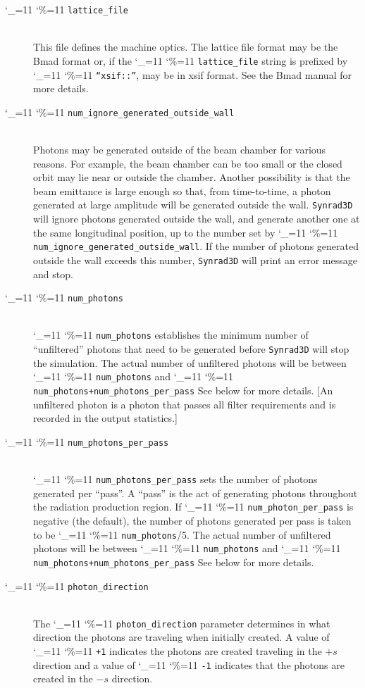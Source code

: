 \documentclass[11pt,openany]{report}
\newcommand{\srthree}{\texttt{Synrad3D}\xspace}
\newcommand\ttcmd{\begingroup\catcode`\_=11 \catcode`\%=11 \dottcmd}
\newcommand\dottcmd[1]{\texttt{#1}\endgroup}
\newcommand{\vn}{\ttcmd}
\newcommand{\Newline}{\hfil \\}
\begin{document}
\begin{description}
  \item[\vn{lattice_file}] \Newline
This file defines the machine optics. The lattice file format may be
the Bmad format or, if the \vn{lattice_file} string is prefixed by
\vn{``xsif::''}, may be in xsif format. See the Bmad manual for more details.

  \item[\vn{num_ignore_generated_outside_wall}] \Newline
Photons may be generated outside of the beam chamber for various
reasons. For example, the beam chamber can be too small or the closed
orbit may lie near or outside the chamber. Another possibility is that
the beam emittance is large enough so that, from time-to-time, a
photon generated at large amplitude will be generated outside the
wall. \srthree will ignore photons generated outside the wall, and
generate another one at the same longitudinal position, up to the
number set by \vn{num_ignore_generated_outside_wall}. If the number of
photons generated outside the wall exceeds this number, \srthree will
print an error message and stop.

  \item[\vn{num_photons}] \Newline
\vn{num_photons} establishes the minimum number of ``unfiltered''
photons that need to be generated before \srthree will stop the
simulation. The actual number of unfiltered photons will be between
\vn{num_photons} and \vn{num_photons+num_photons_per_pass} See
below for more details. [An unfiltered photon is a photon that passes
all filter requirements and is recorded in the output statistics.]

  \item[\vn{num_photons_per_pass}] \Newline
\vn{num_photons_per_pass} sets the number of photons generated per
``pass''.  A ``pass'' is the act of generating photons throughout the
radiation production region. If \vn{num_photon_per_pass} is negative
(the default), the number of photons generated per pass is taken
to be \vn{num_photons}/5. The actual number of unfiltered photons will be between
\vn{num_photons} and \vn{num_photons+num_photons_per_pass} See
below for more details.

  \item[\vn{photon_direction}] \Newline
The \vn{photon_direction} parameter determines in what direction the photons
are traveling when initially created. A value of \vn{+1} indicates the photons
are created traveling in the $+s$ direction and a value of \vn{-1} indicates
that the photons are created in the $-s$ direction.


\end{description}
\end{document}
